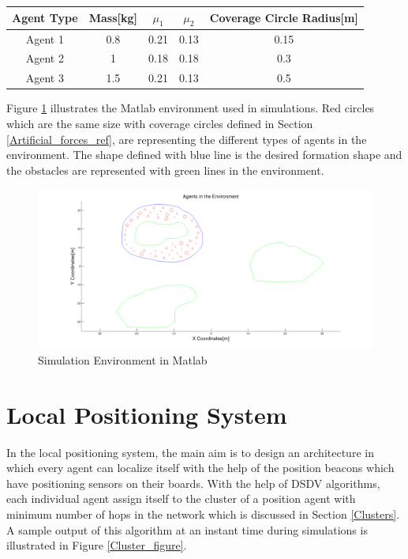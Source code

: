 \begin{center}
 \label{agent_props} 
\begin{tabular}{||c| c| c |c |c||}
				
\hline
\textbf{Agent Type} & \textbf{Mass[kg]}  & \textbf{$\mu_1$} & \textbf{$\mu_2$} & \textbf{Coverage Circle Radius[m]} \\ 
\hline
Agent 1& 0.8 & 0.21  & 0.13 & 0.15\\
Agent 2& 1   &  0.18 & 0.18 & 0.3\\	
Agent 3& 1.5 &  0.21 & 0.13 & 0.5\\	
\hline
\end{tabular}
\end{center}

Figure \ref{Matlab_env} illustrates the Matlab environment used in simulations. Red circles which are the same size with coverage circles defined in Section \ref{Artificial_forces_ref}, are representing the different types of agents in the environment. The shape defined with blue line is the desired formation shape and the obstacles are represented with green lines in the environment. 

\begin{figure}[H]
\caption{Simulation Environment in Matlab} \label{Matlab_env}
\centerline{\includegraphics[scale = 0.30]{2}}
\end{figure} 
    
\section{Local Positioning System} \label{lps_ref}
In the local positioning system, the main aim is to design an architecture in which every agent can localize itself with the help of the position beacons which have positioning sensors on their boards. With the help of DSDV algorithms, each individual agent assign itself to the cluster of a position agent with minimum number of hops in the network which is discussed in Section \ref{Clusters}. A sample output of this algorithm at an instant time during simulations is illustrated in Figure \ref{Cluster_figure}. 
	
